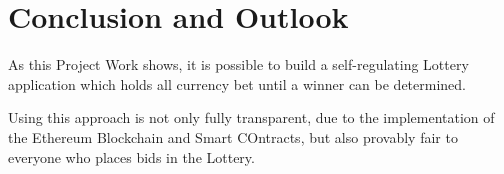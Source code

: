 \chapter{Conclusion and Outlook}\label{chap:conclusion}
\chapterstart

As this Project Work shows, it is possible to build a self-regulating Lottery application which holds all currency bet until a winner can be determined. 

Using this approach is not only fully transparent, due to the implementation of the Ethereum Blockchain and Smart COntracts, but also provably fair to everyone who places bids in the Lottery.

\chapterend
